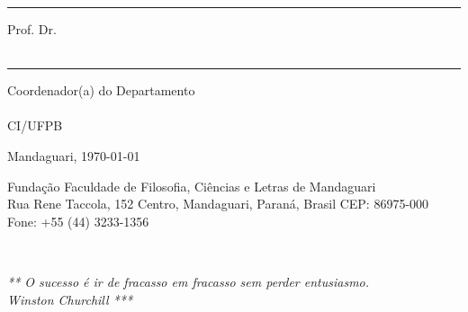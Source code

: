 \documentclass{tcc}
\begin{document}
\vspace{0.25in}

\hrule
\noindent Prof. Dr. \profc\\
\instc\\

\vspace{0.8in}

\hrule
\noindent Coordenador(a) do Departamento \departamento\\
\coordenador\\
CI/UFPB\\

\vfill

\begin{center}
Mandaguari, \today
\end{center}

\vspace{0.05in}

\begin{center}
\footnotesize{ Fundação Faculdade de Filosofia, Ciências e Letras de Mandaguari\\
Rua Rene Taccola, 152  Centro, Mandaguari, Paraná, Brasil CEP: 86975-000\\
Fone: +55 (44) 3233-1356}
\end{center}
\afterpage{\blankpage \addtocounter{page}{1}}
\newpage
$ $
\vfill

\begin{flushright}
\em *** O sucesso é ir de fracasso em fracasso sem perder entusiasmo.\\
Winston Churchill ***
\end{flushright}

\afterpage{\blankpage \addtocounter{page}{1}}

\newpage

\section*{} 


\newpage



\newpage


\newpage



\newpage

\renewcommand{\listfigurename}{\centering LISTA DE FIGURAS}
\listoffigures
\newpage
\end{document}
